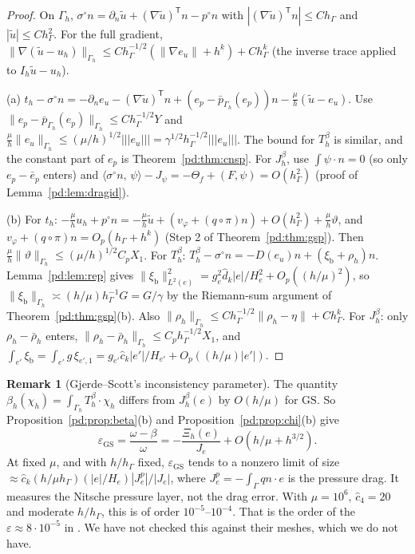 \documentclass[11pt,reqno]{amsart}
\theoremstyle{plain}
\theoremstyle{definition}
\newtheorem{remark}[theorem]{Remark}
\newcommand{\hG}{h_\Gamma}
\newcommand{\Gh}{\Gamma_h}
\newcommand{\dn}{\partial_n}
\newcommand{\ut}{\tilde u}
\newcommand{\pbar}{\bar p}
\newcommand{\ip}[2]{\langle #1,\, #2\rangle}
\newcommand{\tnorm}[1]{|\!|\!|#1|\!|\!|}
\newcommand{\norm}[1]{\lVert #1\rVert}
\newcommand{\GS}{\mathrm{GS}}
\newcommand{\xib}{\xi_{\mathrm b}}
\newcommand{\chat}{\hat c_k}
\begin{document}
\begin{proof}
On $\Gh$, $\sigma^\circ n=\dn\ut+(\nabla\ut)^{\mathsf T}n-p^\circ n$ with $|(\nabla\ut)^{\mathsf T}n|\le C\hG$ and $|\ut|\le C\hG^2$. For the full gradient, $\norm{\nabla(\ut-u_h)}_{\Gh}\le C\hG^{-1/2}(\norm{\nabla e_u}+h^k)+C\hG^k$ (the inverse trace applied to $I_h\ut-u_h$).

(a) $t_h-\sigma^\circ n=-\dn e_u-(\nabla\ut)^{\mathsf T}n+(e_p-\pbar_{\Gh}(e_p))n-\frac\mu h(\ut-e_u)$. Use $\norm{e_p-\pbar_{\Gh}(e_p)}_{\Gh}\le C\hG^{-1/2}Y$ and $\frac\mu h\norm{e_u}_{\Gh}\le(\mu/h)^{1/2}\tnorm{e_u}=\gamma^{1/2}\hG^{-1/2}\tnorm{e_u}$. The bound for $T^\beta_h$ is similar, and the constant part of $e_p$ is Theorem~\ref{pd:thm:cnsp}. For $J^\beta_h$, use $\int\psi\cdot n=0$ (so only $e_p-\bar e_p$ enters) and $\ip{\sigma^\circ n}\psi-J_\psi=-\Theta_f+(F,\psi)=O(\hG^2)$ (proof of Lemma~\ref{pd:lem:dragid}).

(b) For $t_h$: $-\frac\mu hu_h+p^\circ n=-\frac\mu h\ut+(v_\varphi+(q\circ\pi)n)+O(\hG^2)+\frac\mu h\vartheta$, and $v_\varphi+(q\circ\pi)n=O_p(\hG+h^k)$ (Step 2 of Theorem~\ref{pd:thm:gsp}). Then $\frac\mu h\norm\vartheta_{\Gh}\le(\mu/h)^{1/2}C_pX_1$. For $T^\beta_h$: $T^\beta_h-\sigma^\circ n=-D(e_u)n+(\xib+\rho_h)n$. Lemma~\ref{pd:lem:rep} gives $\norm{\xib}^2_{L^2(e)}=g_e^2\hat d_k|e|/H_e^2+O_p((h/\mu)^2)$, so $\norm\xib_{\Gh}\asymp(h/\mu)\hG^{-1}G=G/\gamma$ by the Riemann-sum argument of Theorem~\ref{pd:thm:gsp}(b). Also $\norm{\rho_h}_{\Gh}\le C\hG^{-1/2}\norm{\rho_h-\eta}+C\hG^k$. For $J^\beta_h$: only $\rho_h-\bar\rho_h$ enters, $\norm{\rho_h-\bar\rho_h}_{\Gh}\le C_p\hG^{-1/2}X_1$, and $\int_{e'}\xib=\int_{e'}g\,\xi_{e',1}=g_{e'}\chat|e'|/H_{e'}+O_p((h/\mu)|e'|)$.
\end{proof}

\begin{remark}[Gjerde--Scott's inconsistency parameter]\label{pd:rem:eps}
The quantity $\beta_h(\chi_h)=\int_{\Gh}T^\beta_h\cdot\chi_h$ differs from $J^\beta_h(e)$ by $O(h/\mu)$ for $\GS$. So Proposition~\ref{pd:prop:beta}(b) and Proposition~\ref{pd:prop:chi}(b) give
\[
\varepsilon_{\GS}=\frac{\omega-\beta}{\omega}=-\frac{\Xi_h(e)}{J_e}+O(h/\mu+h^{3/2}).
\]
At fixed $\mu$, and with $h/\hG$ fixed, $\varepsilon_{\GS}$ tends to a nonzero limit of size $\approx\chat(h/\mu\hG)(|e|/H_e)|J^p_e|/|J_e|$, where $J^p_e=-\int_\Gamma qn\cdot e$ is the pressure drag. It measures the Nitsche pressure layer, not the drag error. With $\mu=10^6$, $\hat c_4=20$ and moderate $h/\hG$, this is of order $10^{-5}$--$10^{-4}$. That is the order of the $\varepsilon\approx8\cdot10^{-5}$ in \cite[Table 1b]{GS}. We have not checked this against their meshes, which we do not have.
\end{remark}
\end{document}
